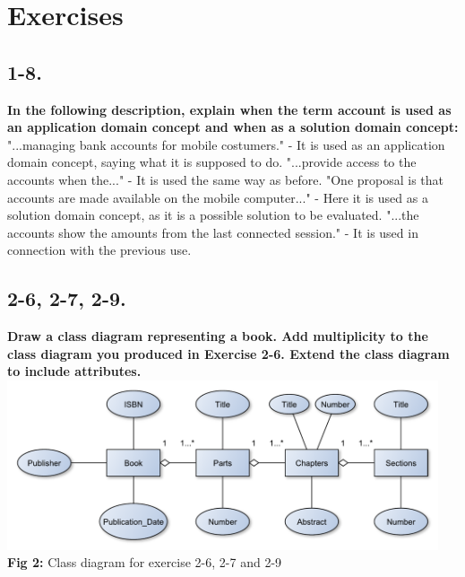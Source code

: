 \documentclass[12pt]{article}
\begin{document}
\newpage
\section{Exercises}
\subsection*{1-8.}
\textbf{In the following description, explain when the term account is used as an application domain concept and when as a solution domain concept:}\\
"...managing bank accounts for mobile costumers." - It is used as an application domain concept, saying what it is supposed to do. 
"...provide access to the accounts when the..." - It is used the same way as before. 
"One proposal is that accounts are made available on the mobile computer..." - Here it is used as a solution domain concept, as it is a possible solution to be evaluated. 
"...the accounts show the amounts from the last connected session." - It is used in connection with the previous use.\\











\subsection*{2-6, 2-7, 2-9.}
\textbf{Draw a class diagram representing a book. Add multiplicity to the class diagram you produced in Exercise 2-6. Extend the class diagram to include attributes.}\\

\includegraphics[height=50mm]{2-6}\\
\textbf{Fig 2:} Class diagram for exercise 2-6, 2-7 and 2-9
\end{document}
